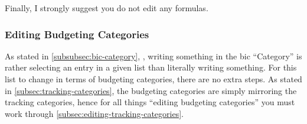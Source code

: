 Finally, I strongly suggest you do not edit any formulas.

\subsubsection{Editing Budgeting Categories}
\label{subsubsec:editing-categories-for-budgeting}

As stated in \autoref{subsubsec:bic-category}, , writing something in the \ac{bic} ``Category'' is rather selecting an entry in a given list than literally writing something.
For this list to change in terms of budgeting categories, there are no extra steps.
As stated in \autoref{subsec:tracking-categories}, the budgeting categories are simply mirroring the tracking categories, hence for all things ``editing budgeting categories'' you must work through \autoref{subsec:editing-tracking-categories}.